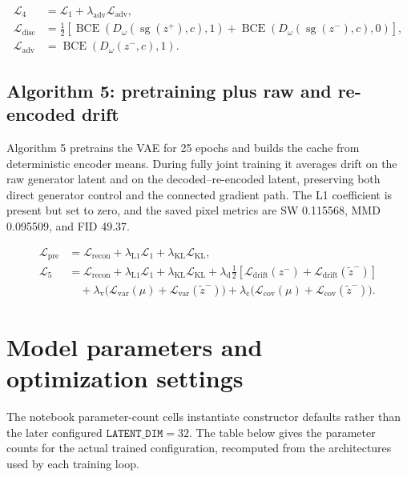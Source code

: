 \documentclass[10pt]{article}
\begin{document}
\[
\begin{aligned}
\mathcal L_4&=\mathcal L_1+\lambda_{\mathrm{adv}}\mathcal L_{\mathrm{adv}},\\
\mathcal L_{\mathrm{disc}}&=\tfrac12\left[
 \operatorname{BCE}(D_\omega(\operatorname{sg}(z^+),c),1)
 +\operatorname{BCE}(D_\omega(\operatorname{sg}(z^-),c),0)\right],\\
\mathcal L_{\mathrm{adv}}&=\operatorname{BCE}(D_\omega(z^-,c),1).
\end{aligned}
\]

\subsection*{Algorithm 5: pretraining plus raw and re-encoded drift}

Algorithm 5 pretrains the VAE for 25 epochs and builds the cache from
deterministic encoder means.  During fully joint training it averages drift
on the raw generator latent and on the decoded--re-encoded latent, preserving
both direct generator control and the connected gradient path.  The L1
coefficient is present but set to zero, and the saved pixel metrics are
SW 0.115568, MMD 0.095509, and FID 49.37.

\[
\begin{aligned}
\mathcal L_{\mathrm{pre}}&=\mathcal L_{\mathrm{recon}}
 +\lambda_{\mathrm{L1}}\mathcal L_1
 +\lambda_{\mathrm{KL}}\mathcal L_{\mathrm{KL}},\\
\mathcal L_5&=\mathcal L_{\mathrm{recon}}
 +\lambda_{\mathrm{L1}}\mathcal L_1
 +\lambda_{\mathrm{KL}}\mathcal L_{\mathrm{KL}}
 +\lambda_{\mathrm d}\tfrac12\left[
 \mathcal L_{\mathrm{drift}}(z^-)+\mathcal L_{\mathrm{drift}}(\widetilde z^-)
 \right]\\
&\quad+\lambda_{\mathrm v}\bigl(\mathcal L_{\mathrm{var}}(\mu)+\mathcal L_{\mathrm{var}}(\widetilde z^- )\bigr)
 +\lambda_{\mathrm c}\bigl(\mathcal L_{\mathrm{cov}}(\mu)+\mathcal L_{\mathrm{cov}}(\widetilde z^- )\bigr).
\end{aligned}
\]

\section*{Model parameters and optimization settings}

The notebook parameter-count cells instantiate constructor defaults rather
than the later configured \(\texttt{LATENT\_DIM}=32\).  The table below gives
the parameter counts for the actual trained configuration, recomputed from
the architectures used by each training loop.
\end{document}
